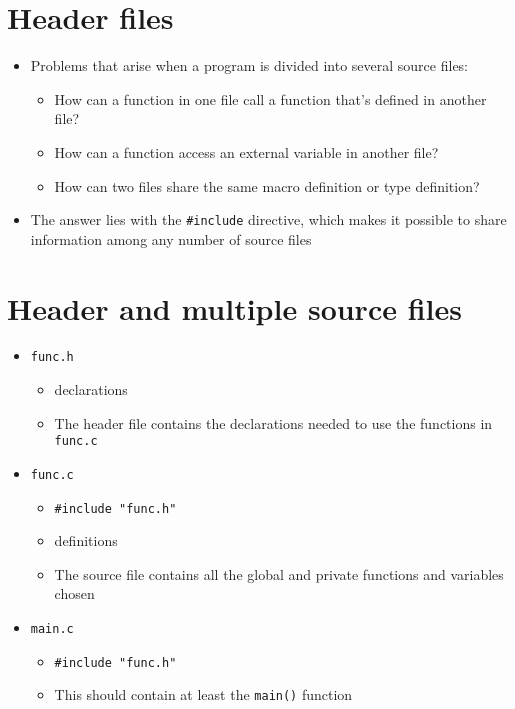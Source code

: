 \documentclass{article}
\begin{document}
\section{Header files}
\begin{itemize}
\item Problems that arise when a program is divided into several source files:
\begin{itemize}
\item How can a function in one file call a function that's defined in another file?
\item How can a function access an external variable in another file?
\item How can two files share the same macro definition or type definition?
\end{itemize}
\item The answer lies with the \verb!#include! directive, which makes it possible to share information among any number of source files
\end{itemize}



\section{Header and multiple source files}

\begin{itemize}
\item \verb!func.h!
\begin{itemize}
\item declarations
\item The header file contains the declarations needed to use the functions in \verb!func.c!
\end{itemize}

\item \verb!func.c!
\begin{itemize}
\item \verb!#include "func.h"!
\item definitions
\item The source file contains all the global and private functions and variables chosen
\end{itemize}

\item \verb!main.c!
\begin{itemize}
\item \verb!#include "func.h"!
\item This should contain at least the \verb!main()! function
\end{itemize}
\end{itemize}
\end{document}
